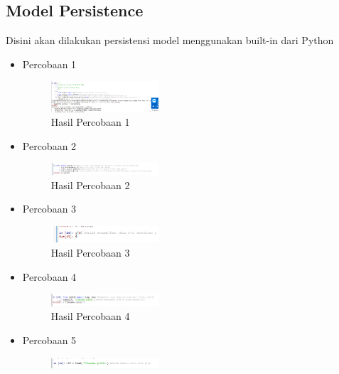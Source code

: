 \subsection{Model Persistence}
Disini akan dilakukan persistensi model menggunakan built-in dari Python
\begin{itemize}
	\item Percobaan 1  \hfill \break 
	\begin{figure}[H]
		\includegraphics[width=4cm]{figures/1174035/chapter1/4_1_hasil.png}
		\centering
		\caption{Hasil Percobaan 1}
	\end{figure}
	\item Percobaan 2 \hfill \break 
	\begin{figure}[H]
		\includegraphics[width=4cm]{figures/1174035/chapter1/4_2_hasil.png}
		\centering
		\caption{Hasil Percobaan 2}
	\end{figure}
	\item Percobaan 3  \hfill \break 
	\begin{figure}[H]
		\includegraphics[width=4cm]{figures/1174035/chapter1/4_3_hasil.png}
		\centering
		\caption{Hasil Percobaan 3}
	\end{figure}
	\item Percobaan 4  \hfill \break 
	\begin{figure}[H]
		\includegraphics[width=4cm]{figures/1174035/chapter1/4_4_hasil.png}
		\centering
		\caption{Hasil Percobaan 4}
	\end{figure}
	\item Percobaan 5  \hfill \break 
	\begin{figure}[H]
		\includegraphics[width=4cm]{figures/1174035/chapter1/4_5_hasil.png}

\end{figure}
\end{itemize}
